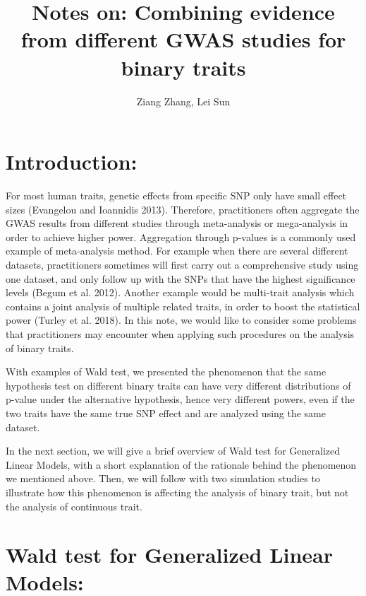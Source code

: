\documentclass[
]{article}
\title{\textbf{Notes on: Combining evidence from different GWAS studies
for binary traits}}
\author{Ziang Zhang, Lei Sun}
\date{}
\begin{document}
\maketitle

\newcommand{\p}{\text{P}}
\newcommand{\E}{\mathbb{E}}
\newcommand{\Var}{\text{Var}}

\hypertarget{introduction}{%
\section{Introduction:}\label{introduction}}

For most human traits, genetic effects from specific SNP only have small
effect sizes (Evangelou and Ioannidis 2013). Therefore, practitioners
often aggregate the GWAS results from different studies through
meta-analysis or mega-analysis in order to achieve higher power.
Aggregation through p-values is a commonly used example of meta-analysis
method. For example when there are several different datasets,
practitioners sometimes will first carry out a comprehensive study using
one dataset, and only follow up with the SNPs that have the highest
significance levels (Begum et al. 2012). Another example would be
multi-trait analysis which contains a joint analysis of multiple related
traits, in order to boost the statistical power (Turley et al. 2018). In
this note, we would like to consider some problems that practitioners
may encounter when applying such procedures on the analysis of binary
traits.

With examples of Wald test, we presented the phenomenon that the same
hypothesis test on different binary traits can have very different
distributions of p-value under the alternative hypothesis, hence very
different powers, even if the two traits have the same true SNP effect
and are analyzed using the same dataset.

In the next section, we will give a brief overview of Wald test for
Generalized Linear Models, with a short explanation of the rationale
behind the phenomenon we mentioned above. Then, we will follow with two
simulation studies to illustrate how this phenomenon is affecting the
analysis of binary trait, but not the analysis of continuous trait.

\hypertarget{wald-test-for-generalized-linear-models}{%
\section{Wald test for Generalized Linear
Models:}\label{wald-test-for-generalized-linear-models}}
\end{document}
